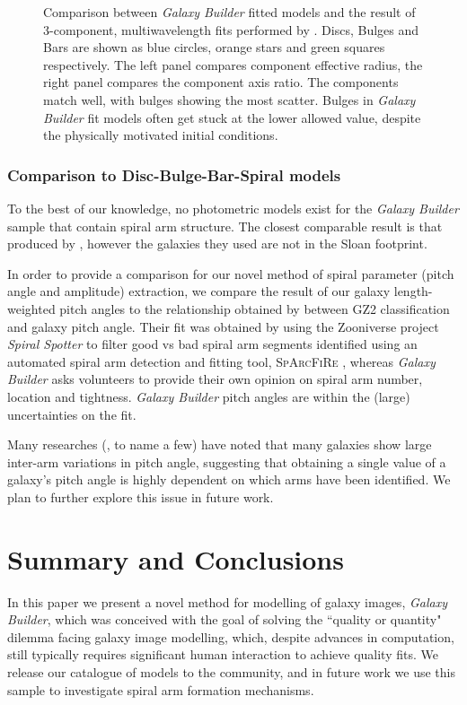 \documentclass[trackchanges]{aastex63}
\begin{document}
\begin{figure}
  \caption{Comparison between \textit{Galaxy Builder} fitted models and the result of 3-component, multi\-wavelength fits performed by \citet{2018MNRAS.473.4731K}. Discs, Bulges and Bars are shown as blue circles, orange stars and green squares respectively. The left panel compares component effective radius, the right panel compares the component axis ratio. The components match well, with bulges showing the most scatter. Bulges in \textit{Galaxy Builder} fit models often get stuck at the lower allowed value, despite the physically motivated initial conditions.}
  \label{fig:sd_comp_comparison}
\end{figure}

\subsubsection{Comparison to Disc-Bulge-Bar-Spiral models}
To the best of our knowledge, no photometric models exist for the \textit{Galaxy Builder} sample that contain spiral arm structure. The closest comparable result is that produced by \citet{Gao2017:1709.00746v1}, however the galaxies they used are not in the Sloan footprint.

In order to provide a comparison for our novel method of spiral parameter (pitch angle and amplitude) extraction, we compare the result of our galaxy length-weighted pitch angles to the relationship obtained by \citet{Hart2016:1607.01019v1} between GZ2 classification and galaxy pitch angle. Their fit was obtained by using the Zooniverse project \textit{Spiral Spotter} to filter good vs bad spiral arm segments identified using an automated spiral arm detection and fitting tool, \textsc{SpArcFiRe} \citep{Davis2014:1402.1910v1}, whereas \textit{Galaxy Builder} asks volunteers to provide their own opinion on spiral arm number, location and tightness. \textit{Galaxy Builder} pitch angles are within the (large) uncertainties on the \citet{Hart2016:1607.01019v1} fit.

Many researches (\citealt{Davis2014:1402.1910v1}, \citealt{2019arXiv190804246D} to name a few) have noted that many galaxies show large inter-arm variations in pitch angle, suggesting that obtaining a single value of a galaxy's pitch angle is highly dependent on which arms have been identified. We plan to further explore this issue in future work.

\section{Summary and Conclusions}
\label{sec:conclusions}
In this paper we present a novel method for modelling of galaxy images, \textit{Galaxy Builder}, which was conceived with the goal of solving the ``quality or quantity" dilemma facing galaxy image modelling, which, despite advances in computation, still typically requires significant human interaction to achieve quality fits. We release our catalogue of models to the community, and in future work we use this sample to investigate spiral arm formation mechanisms.
\end{document}
